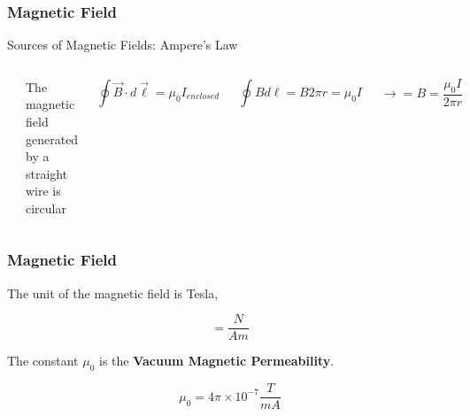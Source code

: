 \documentclass[]{beamer}
\begin{document}
\begin{frame}
\frametitle{Magnetic Field}



Sources of Magnetic Fields: Ampere's Law



   \begin{columns}[c]
   \column{2in}  %
  

  \begin{center}
  \includegraphics[height=1.5in]{images5/B.jpg}
\end{center}

\pause

The magnetic field generated by a straight wire is circular

   \column{2in}


\pause


\begin{equation*}
\oint \vec{B}\cdot d\vec{\ell}=\mu_0 I_{enclosed}
\end{equation*}

\pause

\begin{equation*}
\oint B d\ell=B 2\pi r=\mu_0I
\end{equation*}
\pause

\begin{equation}
\rightarrow=B =\frac{\mu_0I}{2\pi r}
\end{equation}

   \end{columns}




  \end{frame}



\begin{frame}
\frametitle{Magnetic Field}

The unit of the magnetic field is Tesla,

\begin{equation}
[B]=\frac{N}{A m}
\end{equation}

The constant $\mu_0$ is the \textbf{Vacuum Magnetic  Permeability}.

\begin{equation}
\mu_0=4\pi \times 10^{-7} \frac{T}{m A}
\end{equation}



  \end{frame}
\end{document}
